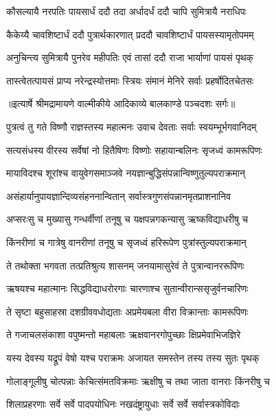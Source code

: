\twolineshloka
{कौसल्यायै नरपतिः पायसार्धं ददौ तदा}
{अर्धादर्धं ददौ चापि सुमित्रायै नराधिपः} %

\twolineshloka
{कैकेय्यै चावशिष्टार्धं ददौ पुत्रार्थकारणात्}
{प्रददौ चावशिष्टार्धं पायसस्यामृतोपमम्} %

\twolineshloka
{अनुचिन्त्य सुमित्रायै पुनरेव महीपतिः}
{एवं तासां ददौ राजा भार्याणां पायसं पृथक्} %

\twolineshloka
{तास्त्वेतत्पायसं प्राप्य नरेन्द्रस्योत्तमाः स्त्रियः}
{संमानं मेनिरे सर्वाः प्रहर्षोदितचेतसः} %


{॥इत्यार्षे श्रीमद्रामायणे वाल्मीकीये आदिकाव्ये बालकाण्डे पञ्चदशः सर्गः॥}


\twolineshloka
{पुत्रत्वं तु गते विष्णौ राज्ञस्तस्य महात्मनः}
{उवाच देवताः सर्वाः स्वयम्भूर्भगवानिदम्} %

\twolineshloka
{सत्यसंधस्य वीरस्य सर्वेषां नो हितैषिणः}
{विष्णोः सहायान्बलिनः सृजध्वं कामरूपिणः} %

\twolineshloka
{मायाविदश्च शूरांश्च वायुवेगसमाञ्जवे}
{नयज्ञान्बुद्धिसंपन्नान्विष्णुतुल्यपराक्रमान्} %

\twolineshloka
{असंहार्यानुपायज्ञान्दिव्यसंहननान्वितान्}
{सर्वास्त्रगुणसंपन्नानमृतप्राशनानिव} %

\twolineshloka
{अप्सरःसु च मुख्यासु गन्धर्वीणां तनूषु च}
{यक्षपन्नगकन्यासु ऋष्कविद्याधरीषु च} %

\twolineshloka
{किंनरीणां च गात्रेषु वानरीणां तनूषु च}
{सृजध्वं हरिरूपेण पुत्रांस्तुल्यपराक्रमान्} %

\twolineshloka
{ते तथोक्ता भगवता तत्प्रतिश्रुत्य शासनम्}
{जनयामासुरेवं ते पुत्रान्वानररूपिणः} %

\twolineshloka
{ऋषयश्च महात्मानः सिद्धविद्याधरोरगाः}
{चारणाश्च सुतान्वीरान्ससृजुर्वनचारिणः} %

\twolineshloka
{ते सृष्टा बहुसाहस्रा दशग्रीववधोद्यताः}
{अप्रमेयबला वीरा विक्रान्ताः कामरूपिणः} %

\twolineshloka
{ते गजाचलसंकाशा वपुष्मन्तो महाबलाः}
{ऋक्षवानरगोपुच्छाः क्षिप्रमेवाभिजज्ञिरे} %

\twolineshloka
{यस्य देवस्य यद्रूपं वेषो यश्च पराक्रमः}
{अजायत समस्तेन तस्य तस्य सुतः पृथक्} %

\twolineshloka
{गोलाङ्गूलीषु चोत्पन्नाः केचित्संमतविक्रमाः}
{ऋक्षीषु च तथा जाता वानराः किंनरीषु च} %

\twolineshloka
{शिलाप्रहरणाः सर्वे सर्वे पादपयोधिनः}
{नखदंष्ट्रायुधाः सर्वे सर्वे सर्वास्त्रकोविदाः} %

